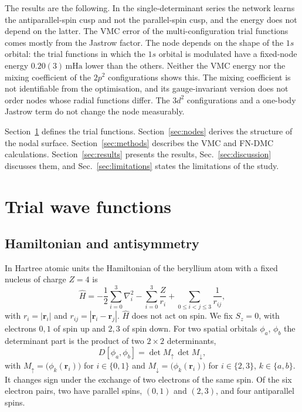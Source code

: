 \documentclass[aps,prb,reprint,amsmath,amssymb,superscriptaddress,nofootinbib]{revtex4-2}
\newcommand{\mHa}{\,\mathrm{mHa}}
\begin{document}
The results are the following. In the single-determinant series the network
learns the antiparallel-spin cusp and not the parallel-spin cusp, and the
energy does not depend on the latter. The VMC error of the multi-configuration
trial functions comes mostly from the Jastrow factor. The node depends on the
shape of the $1s$ orbital: the trial functions in which the $1s$ orbital is
modulated have a fixed-node energy $0.20(3)\mHa$ lower than the others.
Neither the VMC energy nor the mixing coefficient of the $2p^2$ configurations
shows this. The mixing coefficient is not identifiable from the optimisation,
and its gauge-invariant version does not order nodes whose radial functions
differ. The $3d^2$ configurations and a one-body Jastrow term do not change
the node measurably.

Section~\ref{sec:wavefunction} defines the trial functions.
Section~\ref{sec:nodes} derives the structure of the nodal surface.
Section~\ref{sec:methods} describes the VMC and FN-DMC calculations.
Section~\ref{sec:results} presents the results, Sec.~\ref{sec:discussion}
discusses them, and Sec.~\ref{sec:limitations} states the limitations of the
study.


\section{Trial wave functions}
\label{sec:wavefunction}

\subsection{Hamiltonian and antisymmetry}

In Hartree atomic units the Hamiltonian of the beryllium atom with a fixed
nucleus of charge $Z = 4$ is
\begin{equation}
    \hat{H} = -\frac{1}{2}\sum_{i=0}^{3} \nabla_i^2
              - \sum_{i=0}^{3} \frac{Z}{r_i}
              + \sum_{0\le i<j\le 3} \frac{1}{r_{ij}} ,
    \label{eq:hamiltonian}
\end{equation}
with $r_i = |\mathbf{r}_i|$ and $r_{ij} = |\mathbf{r}_i - \mathbf{r}_j|$.
$\hat H$ does not act on spin. We fix $S_z = 0$, with electrons $0, 1$ of
spin up and $2, 3$ of spin down. For two spatial orbitals $\phi_a$, $\phi_b$
the determinant part is the product of two $2\times2$ determinants,
\begin{equation}
    D[\phi_a, \phi_b] = \det M_\uparrow \, \det M_\downarrow ,
    \label{eq:det_product}
\end{equation}
with $M_\uparrow = \bigl(\phi_k(\mathbf{r}_i)\bigr)$ for $i \in \{0, 1\}$ and
$M_\downarrow = \bigl(\phi_k(\mathbf{r}_i)\bigr)$ for $i \in \{2, 3\}$,
$k \in \{a, b\}$.
It changes sign under the exchange of two electrons of the same spin. Of the
six electron pairs, two have parallel spins, $(0,1)$ and $(2,3)$, and four
antiparallel spins.
\end{document}
